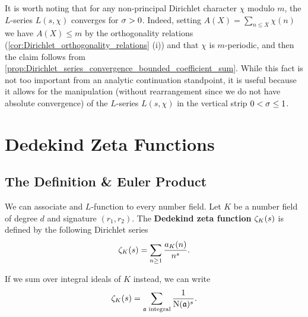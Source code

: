       It is worth noting that for any non-principal Dirichlet character $\chi$ modulo $m$, the $L$-series $L(s,\chi)$ converges for $\sigma > 0$. Indeed, setting $A(X) = \sum_{n \le X}\chi(n)$ we have $A(X) \le m$ by the orthogonality relations (\cref{cor:Dirichlet_orthogonality_relations} (i)) and that $\chi$ is $m$-periodic, and then the claim follows from \cref{prop:Dirichlet_series_convergence_bounded_coefficient_sum}. While this fact is not too important from an analytic continuation standpoint, it is useful because it allows for the manipulation (without rearrangement since we do not have absolute convergence) of the $L$-series $L(s,\chi)$ in the vertical strip $0 < \sigma \le 1$.
  \section{Dedekind Zeta Functions}
    \subsection*{The Definition \& Euler Product}
      We can associate and $L$-function to every number field. Let $K$ be a number field of degree $d$ and signature $(r_{1},r_{2})$. The \textbf{Dedekind zeta function} $\zeta_{K}(s)$ is defined by the following Dirichlet series
      \[
        \zeta_{K}(s) = \sum_{n \ge 1}\frac{a_{K}(n)}{n^{s}}.
      \]

      \begin{remark}
        If we sum over integral ideals of $K$ instead, we can write
        \[
          \zeta_{K}(s) = \sum_{\text{$\mathfrak{a}$ integral}}\frac{1}{\operatorname{\mathrm{N}}(\mathfrak{a})^{s}}.
        \]
      \end{remark}

